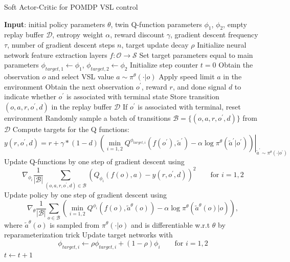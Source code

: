 \documentclass[11pt, letterpaper]{article}
\begin{document}
\begin{algorithm}[!ht]
    \caption{Soft Actor-Critic for POMDP VSL control}
    \label{alg:1}
    \begin{algorithmic}
        \State \textbf{Input}: initial policy parameters $\theta$, twin Q-function parameters $\phi_1$, $\phi_2$, empty replay buffer $\mathcal{D}$, entropy weight $\alpha$, reward discount $\gamma$, gradient descent frequency $\tau$, number of gradient descent steps $n$, target update decay $\rho$
        \State
        \State Initialize neural network feature extraction layers $f:\mathcal{O}\rightarrow\mathcal{S}$
        \State Set target parameters equal to main parameters $\phi_{target, 1}\leftarrow\phi_1$, $\phi_{target, 2}\leftarrow\phi_2$
        \State Initialize step counter $t=0$
        \Loop
            \State Obtain the observation $o$ and select VSL value $a\sim\pi^\theta(\cdot|o)$
            \State Apply speed limit $a$ in the environment
            \State Obtain the next observation $o^\prime$, reward $r$, and done signal $d$ to indicate whether $o^\prime$ is associated with terminal state
            \State Store transition $(o, a, r, o^\prime, d)$ in the replay buffer $\mathcal{D}$
            \State If $o^\prime$ is associated with terminal, reset environment
                    \State Randomly sample a batch of transitions $\mathcal{B}=\{(o, a, r, o^\prime, d)\}$ from $\mathcal{D}$
                    \State Compute targets for the Q functions: $$y(r,o^\prime, d)=r+\gamma*(1-d)\left.\left(\min_{i=1,2}Q^{\phi_{target, i}}\left(f(o^\prime), \tilde{a}^\prime\right) - \alpha\log\pi^\theta(\tilde{a}^\prime|o^\prime)\right)\right|_{\tilde{a}^\prime\sim\pi^\theta(\cdot|o^\prime)}$$
                    \State Update Q-functions by one step of gradient descent using $$\nabla_{\phi_i}\frac{1}{|\mathcal{B}|}\sum_{(o, a, r, o^\prime, d)\in\mathcal{B}}\left(Q_{\phi_i}\left(f(o), a\right)-y(r,o^\prime, d)\right)^2\qquad \textrm{for }i=1,2$$
                    \State Update policy by one step of gradient descent using $$\nabla_\theta\frac{1}{|\mathcal{B}|}\sum_{o\in\mathcal{B}}\left(\min_{i=1,2}Q^{\phi_i}\left(f(o), \tilde{a}^\theta(o)\right) - \alpha\log\pi^\theta(\tilde{a}^\theta(o)|o)\right),$$
                    \State where $\tilde{a}^\theta(o)$ is sampled from $\pi^\theta(\cdot|o)$ and is differentiable w.r.t $\theta$ by reparameterization trick
                    \State Update target networks with $$\phi_{target, i}\leftarrow\rho\phi_{target, i} + (1-\rho)\phi_i\qquad\textrm{for }i=1,2$$
                \EndFor
            \EndIf
            \State $t\leftarrow t+1$
        \EndLoop
    \end{algorithmic}
\end{algorithm}
\end{document}
